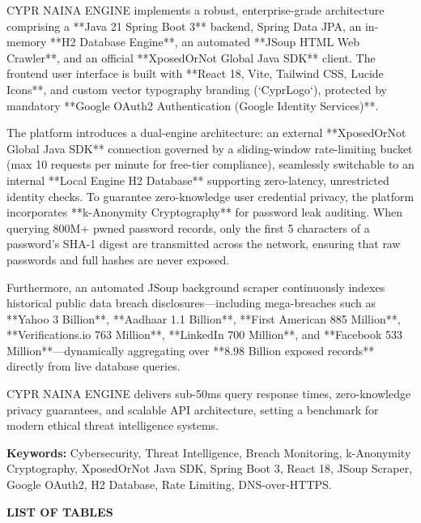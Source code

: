 \documentclass[12pt,a4paper,oneside]{report}
\begin{document}
CYPR NAINA ENGINE implements a robust, enterprise-grade architecture comprising a **Java 21 Spring Boot 3** backend, Spring Data JPA, an in-memory **H2 Database Engine**, an automated **JSoup HTML Web Crawler**, and an official **XposedOrNot Global Java SDK** client. The frontend user interface is built with **React 18, Vite, Tailwind CSS, Lucide Icons**, and custom vector typography branding (`CyprLogo`), protected by mandatory **Google OAuth2 Authentication (Google Identity Services)**.

The platform introduces a dual-engine architecture: an external **XposedOrNot Global Java SDK** connection governed by a sliding-window rate-limiting bucket (max 10 requests per minute for free-tier compliance), seamlessly switchable to an internal **Local Engine H2 Database** supporting zero-latency, unrestricted identity checks. To guarantee zero-knowledge user credential privacy, the platform incorporates **k-Anonymity Cryptography** for password leak auditing. When querying 800M+ pwned password records, only the first 5 characters of a password's SHA-1 digest are transmitted across the network, ensuring that raw passwords and full hashes are never exposed.

Furthermore, an automated JSoup background scraper continuously indexes historical public data breach disclosures—including mega-breaches such as **Yahoo 3 Billion**, **Aadhaar 1.1 Billion**, **First American 885 Million**, **Verifications.io 763 Million**, **LinkedIn 700 Million**, and **Facebook 533 Million**—dynamically aggregating over **8.98 Billion exposed records** directly from live database queries.

CYPR NAINA ENGINE delivers sub-50ms query response times, zero-knowledge privacy guarantees, and scalable API architecture, setting a benchmark for modern ethical threat intelligence systems.

\vspace{0.5cm}
\noindent\textbf{Keywords:} Cybersecurity, Threat Intelligence, Breach Monitoring, k-Anonymity Cryptography, XposedOrNot Java SDK, Spring Boot 3, React 18, JSoup Scraper, Google OAuth2, H2 Database, Rate Limiting, DNS-over-HTTPS.

\clearpage

\cleardoublepage
\pagestyle{fancy}
\tableofcontents
\clearpage

\cleardoublepage
{}
\begin{center}
  \Large\bfseries LIST OF TABLES
\end{center}
\vspace{1cm}
\listoftables
\clearpage
\end{document}
